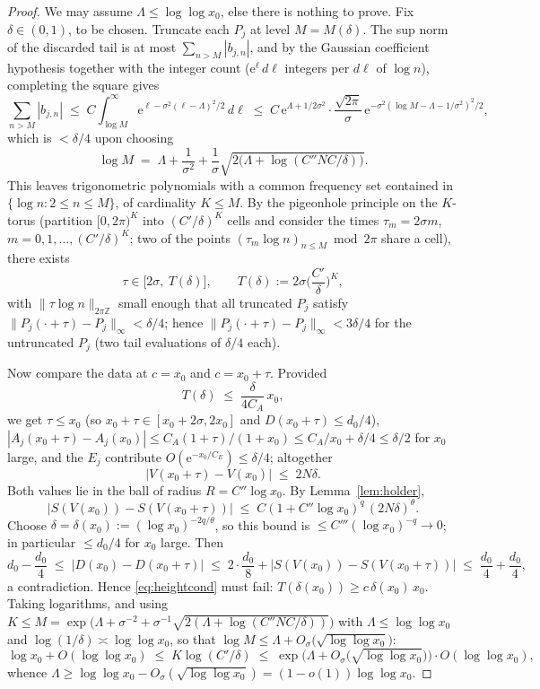 \documentclass[11pt]{amsart}
\theoremstyle{definition}
\theoremstyle{remark}
\newcommand{\ZZ}{\mathbb{Z}}
\newcommand{\eE}{\mathrm{e}}
\begin{document}
\begin{proof}
We may assume $\Lambda\le\log\log x_0$, else there is nothing to prove. Fix $\delta\in(0,1)$, to be chosen. Truncate each $P_j$ at level $M=M(\delta)$. The sup norm of the discarded tail is at most $\sum_{n>M}|b_{j,n}|$, and by the Gaussian coefficient hypothesis together with the integer count ($\eE^{\ell}\,d\ell$ integers per $d\ell$ of $\log n$), completing the square gives
\[
\sum_{n>M}|b_{j,n}|\;\le\;C\!\int_{\log M}^{\infty}\!\eE^{\ell-\sigma^2(\ell-\Lambda)^2/2}\,d\ell
\;\le\;C\,\eE^{\Lambda+1/2\sigma^2}\cdot\frac{\sqrt{2\pi}}{\sigma}\,\eE^{-\sigma^2(\log M-\Lambda-1/\sigma^2)^2/2},
\]
which is $<\delta/4$ upon choosing
\[
\log M\;=\;\Lambda+\frac1{\sigma^2}+\frac1\sigma\sqrt{2\big(\Lambda+\log(C''N C/\delta)\big)} .
\]
This leaves trigonometric polynomials with a common frequency set contained in $\{\log n:2\le n\le M\}$, of cardinality $K\le M$. By the pigeonhole principle on the $K$-torus (partition $[0,2\pi)^K$ into $(C'/\delta)^K$ cells and consider the times $\tau_m=2\sigma m$, $m=0,1,\dots,(C'/\delta)^K$; two of the points $(\tau_m\log n)_{n\le M}\bmod2\pi$ share a cell), there exists
\[
\tau\in\big[2\sigma,\ T(\delta)\big],\qquad T(\delta):=2\sigma\Big(\frac{C'}{\delta}\Big)^{K},
\]
with $\|\tau\log n\|_{2\pi\ZZ}$ small enough that all truncated $P_j$ satisfy $\|P_j(\cdot+\tau)-P_j\|_\infty<\delta/4$; hence $\|P_j(\cdot+\tau)-P_j\|_\infty<3\delta/4$ for the untruncated $P_j$ (two tail evaluations of $\delta/4$ each).

Now compare the data at $c=x_0$ and $c=x_0+\tau$. Provided
\begin{equation}\label{eq:heightcond}
T(\delta)\;\le\;\frac{\delta}{4C_A}\,x_0 ,
\end{equation}
we get $\tau\le x_0$ (so $x_0+\tau\in[x_0+2\sigma,2x_0]$ and $D(x_0+\tau)\le d_0/4$), $|A_j(x_0+\tau)-A_j(x_0)|\le C_A(1+\tau)/(1+x_0)\le C_A/x_0+\delta/4\le\delta/2$ for $x_0$ large, and the $E_j$ contribute $O(\eE^{-x_0/C_E})\le\delta/4$; altogether
\[
\big|V(x_0+\tau)-V(x_0)\big|\;\le\;2N\delta .
\]
Both values lie in the ball of radius $R=C''\log x_0$. By Lemma~\ref{lem:holder},
\[
\big|S(V(x_0))-S(V(x_0+\tau))\big|\;\le\;C(1+C''\log x_0)^q\,(2N\delta)^\theta .
\]
Choose $\delta=\delta(x_0):=(\log x_0)^{-2q/\theta}$, so this bound is $\le C'''(\log x_0)^{-q}\to0$; in particular $\le d_0/4$ for $x_0$ large. Then
\[
d_0-\frac{d_0}4\;\le\;\big|D(x_0)-D(x_0+\tau)\big|
\;\le\;2\cdot\frac{d_0}8+\big|S(V(x_0))-S(V(x_0+\tau))\big|\;\le\;\frac{d_0}4+\frac{d_0}4,
\]
a contradiction. Hence \eqref{eq:heightcond} must fail: $T(\delta(x_0))\ge c\,\delta(x_0)\,x_0$. Taking logarithms, and using $K\le M=\exp\big(\Lambda+\sigma^{-2}+\sigma^{-1}\sqrt{2(\Lambda+\log(C''NC/\delta))}\big)$ with $\Lambda\le\log\log x_0$ and $\log(1/\delta)\asymp\log\log x_0$, so that $\log M\le\Lambda+O_\sigma\big(\sqrt{\log\log x_0}\big)$:
\[
\log x_0+O(\log\log x_0)\;\le\;K\log(C'/\delta)\;\le\;\exp\Big(\Lambda+O_\sigma\big(\sqrt{\log\log x_0}\big)\Big)\cdot O(\log\log x_0),
\]
whence $\Lambda\ge\log\log x_0-O_\sigma(\sqrt{\log\log x_0})=(1-o(1))\log\log x_0$.
\end{proof}
\end{document}
